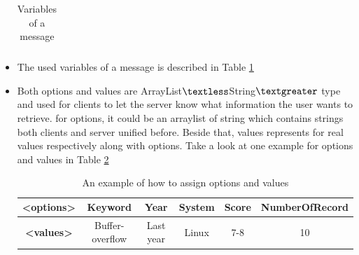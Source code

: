 \documentclass[a4paper,12pt,oneside]{report}
\begin{document}
\begin{itemize}
\begin{table}[h]
\begin{tabular}{|c|l|c|ll}
\end{tabular}
\caption{Variables of a message}
\label{table:messVariable}
\end{table}
			\item The used variables of a message is described in Table \ref{table:messVariable}
			\item Both options and values are ArrayList$\textless$String$\textgreater$ type and used for clients to let the server know what information the user wants to retrieve. for options, it could be an arraylist of string which contains strings both clients and server unified before. Beside that, values represents for real values respectively along with options. Take a look at one example for options and values in Table \ref{table:opvaex}
			
\begin{table}[h]
\centering
\begin{tabular}{|c|c|c|c|c|c|}
\hline
\textbf{\textless options\textgreater} & Keyword & Year & System & Score & NumberOfRecord \\ \hline
\textbf{\textless values\textgreater} & Buffer-overflow & Last year & Linux & 7-8 & 10 \\ \hline
\end{tabular}
\caption{An example of how to assign options and values}
\label{table:opvaex}
\end{table}



\end{itemize}
\end{document}
